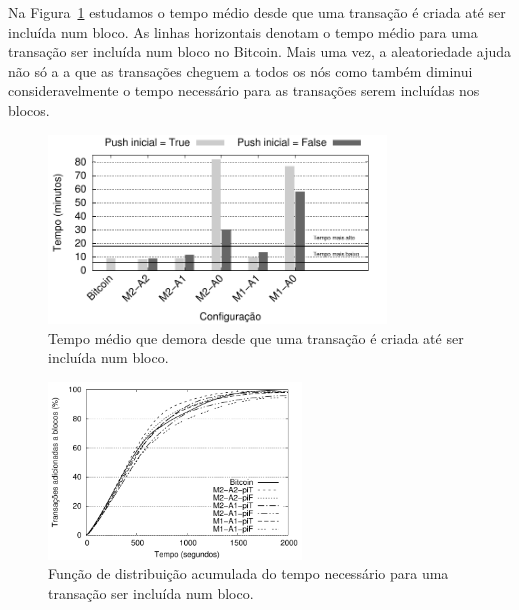 Na Figura~\ref{fig:commit-time} estudamos o tempo médio desde que uma transação é criada até ser incluída num bloco. As linhas horizontais denotam o tempo médio para uma transação ser incluída num bloco no Bitcoin. 
Mais uma vez, a aleatoriedade ajuda não só a a que as transações cheguem a todos os nós como também diminui consideravelmente o tempo necessário para as transações serem incluídas nos blocos.
\vspace{-0.6cm}

\begin{figure}
\centering
\includegraphics[width=0.8\textwidth]{plots/commit-time.pdf}
\caption{Tempo médio que demora desde que uma transação é criada até ser incluída num bloco.}
\label{fig:commit-time}
\vspace{-1.5cm}
\end{figure}


\begin{figure}
\centering
\includegraphics[width=0.6\textwidth]{plots/cdf_commit_2000.pdf}
\caption{Função de distribuição acumulada do tempo necessário para uma transação ser incluída num bloco.}
\label{fig:cdf-commit}
\vspace{-0.5cm}
\end{figure}


